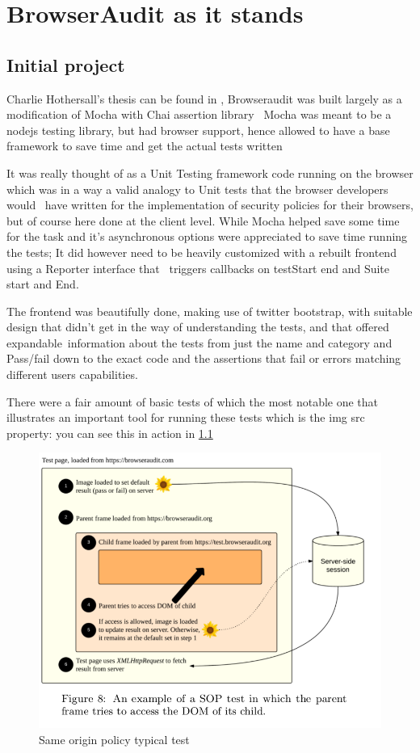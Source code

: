 \chapter{BrowserAudit as it stands}


\section{Initial project}

Charlie Hothersall's thesis can be found in \cite{charlie} , Browseraudit was built largely as a modification of Mocha with Chai assertion library \
Mocha was meant to be a nodejs testing library, but had browser support, hence allowed to have a base framework to save time and get the actual tests written \

It was really thought of as a Unit Testing framework code running on the browser which was in a way a valid analogy to Unit tests that the browser developers would \
have written for the implementation of security policies for their browsers, but of course here done at the client level. While Mocha helped save some time for the task and
it's asynchronous options were appreciated to save time running the tests; It did however need to be heavily customized with a rebuilt frontend using a Reporter interface that \
triggers callbacks on testStart end and Suite start and End.\ 

The frontend was beautifully done, making use of twitter bootstrap, with suitable design that didn't get in the way of understanding the tests, and that offered expandable\
information about the tests from just the name and category and Pass/fail down to the exact code and the assertions that fail or errors matching different users capabilities.\

There were a fair amount of basic tests of which the most notable one that illustrates an important tool for running these tests which is the img src property:
you can see this in action in \ref{fig:sop} 

\begin{figure}
\centering
\includegraphics[width=1\textwidth]{./SOPbasic.png}
\caption{\label{fig:sop}Same origin policy typical test}
\end{figure}

